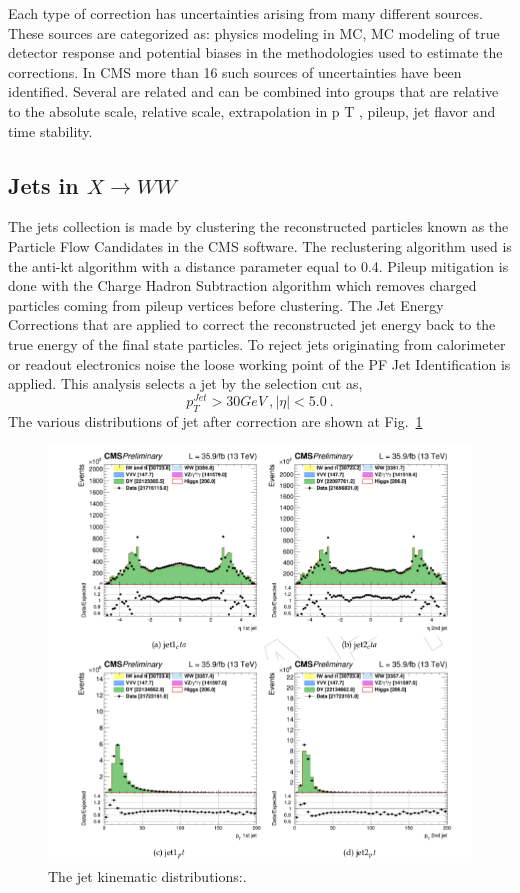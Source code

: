 Each type of correction has uncertainties arising from many different sources.
These sources are categorized as: physics modeling in MC, MC modeling of true detector response and potential biases in the methodologies used to estimate the corrections. In CMS more than 16 such sources of uncertainties have been identified. Several are
related and can be combined into groups that are relative to the absolute scale, relative
scale, extrapolation in p T , pileup, jet flavor and time stability.

\subsection*{Jets in $X \to WW$}
The jets collection is made by clustering the reconstructed particles known as the Particle Flow
Candidates in the CMS software. The reclustering algorithm used is the anti-kt algorithm with
a distance parameter equal to 0.4. Pileup mitigation is done with the Charge Hadron Subtraction  algorithm 
which removes charged particles coming from pileup vertices before
clustering.
The Jet Energy Corrections  that are applied to correct the reconstructed jet energy back
to the true energy of the final state particles.  To reject jets originating
from calorimeter or readout electronics noise the loose working point of the PF Jet Identification is applied. 
This analysis selects a jet by the selection cut as,
\begin{equation}
 p_T^{Jet} > 30 GeV \: , |\eta| < 5.0 \: .
\end{equation}
The various distributions of jet after correction are shown at Fig.~\ref{jetFig}
\begin{figure}
\centering
\includegraphics[scale= 0.5]{../Cap4/jetFig}
\caption{The jet kinematic distributions:.}
\label{jetFig}
\end{figure}

